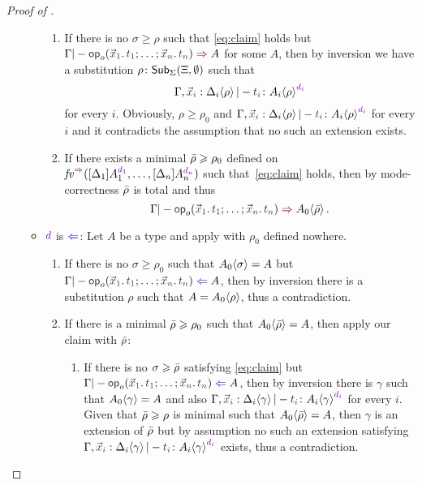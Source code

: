 \begin{proof}[Proof of {}]
\begin{itemize}
\begin{itemize}
          \begin{enumerate}
            \item If there is no $\sigma \geq \rho$ such that \eqref{eq:claim} holds but $\Gamma |- \tmOpts \syn A$ for some $A$, then by inversion we have a substitution $\rho\colon \mathsf{Sub}_{\Sigma}(\Xi,\emptyset)$ such that
              \[
                \Gamma, \vars{x}_\isTerm{i} : \simsub{\Delta_i}{\rho} |- \isTerm{t_i} \colon \simsub{A_i}{\rho}^{\dir{d_i}}
              \]
              for every $i$.
              Obviously, $\rho \geq \rho_0$ and ${\Gamma, \vars{x}_\isTerm{i} : \simsub{\Delta_i}{\rho} |- \isTerm{t_i} \colon \simsub{A_i}{\rho}^{\dir{d_i}}}$ for every $i$ and it contradicts the assumption that no such an extension exists.

            \item If there exists a minimal $\bar{\rho} \geqslant \rho_0$ defined on $\synvar(\biargs)$ such that~\eqref{eq:claim} holds, then by mode-correctness $\bar{\rho}$ is total and thus
              \[
                \Gamma |- \tmOpts \syn \simsub{A_0}{\ext{\rho}}.
              \]
          \end{enumerate}

        \item $\dir{d}$ is $\chk$: Let $A$ be a type and apply  with $\rho_0$ defined nowhere.
          \begin{enumerate}
            \item If there is no $\sigma \geq \rho_0$ such that ${A_0}\!\left<{\sigma}\right> = A$ but $\Gamma |- \tmOpts \chk A$, then by inversion there is a substitution $\rho$ such that $A = {A_0}\!\left<{\rho}\right>$, thus a contradiction.
            \item If there is a minimal $\bar{\rho} \geqslant \rho_0$ such that ${A_0}\!\left<{\bar{\rho}}\right> = A$, then apply our claim with $\bar{\rho}$:
              \begin{enumerate}
                \item If there is no $\sigma \geqslant \bar{\rho}$ satisfying \eqref{eq:claim} but $\Gamma |- \tmOpts \chk A$, then by inversion there is $\gamma$ such that ${A_0}\!\left<{\gamma}\right> = A$ and also ${\Gamma, \vars{x}_\isTerm{i} : \simsub{\Delta_i}{\gamma} |- \isTerm{t_i} \colon \simsub{A_i}{\gamma}^{\dir{d_i}}}$ for every $i$.
                  Given that $\bar{\rho} \geqslant \rho$ is minimal such that ${A_0}\!\left<{\bar{\rho}}\right> = A$, then $\gamma$ is an extension of $\bar{\rho}$ but by assumption no such an extension satisfying ${\Gamma, \vars{x}_\isTerm{i} : \simsub{\Delta_i}{\gamma} |- \isTerm{t_i} \colon \simsub{A_i}{\gamma}^{\dir{d_i}}}$ exists, thus a contradiction.
                

\end{enumerate}
\end{enumerate}
\end{itemize}
\end{itemize}
\end{proof}
